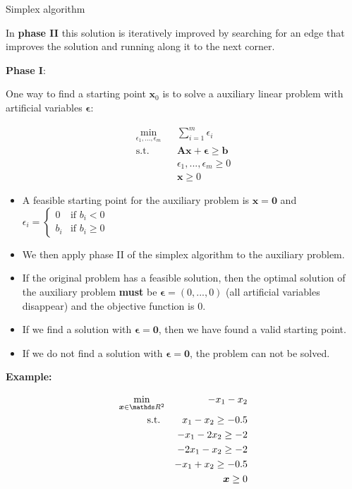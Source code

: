 \begin{vbframe}{Simplex algorithm}
\lz

In \textbf{phase II} this solution is iteratively improved by searching for an edge that improves the solution and running along it to the next corner.

\framebreak

\textbf{Phase I}:

One way to find a starting point $\bm{x}_0$ is to solve a auxiliary linear problem with artificial variables $\bm{\epsilon}$:

\begin{eqnarray*}
\min_{\epsilon_1, ..., \epsilon_m} && \sum_{i = 1}^m \epsilon_i \\
\text{s.t. } && \bm{Ax} + \bm{\epsilon} \ge \bm{b} \\
&& \epsilon_1, ..., \epsilon_m \ge 0\\
&& \bm{x} \ge 0
\end{eqnarray*}

\begin{itemize}
\item A feasible starting point for the auxiliary problem is $\bm{x} = \bm{0}$ and $\epsilon_i = \begin{cases} 0 & \text{if } b_i < 0 \\
b_i & \text{if } b_i \ge 0
\end{cases}$
\item We then apply phase II of the simplex algorithm to the auxiliary problem.
\item If the original problem has a feasible solution, then the optimal solution of the auxiliary problem \textbf{must} be $\bm{\epsilon} = (0, ..., 0)$ (all artificial variables disappear) and the objective function is $0$.
\item If we find a solution with $\bm{\epsilon} = \bm{0}$, then we have found a valid starting point.
\item If we do not find a solution with $\bm{\epsilon} = \bm{0}$, the problem can not be solved.
\end{itemize}

\framebreak

\textbf{Example:}

\begin{eqnarray*}
\min_{\bm{x} \in \R^2} && -x_1 - x_2 \\
\text{s.t. } && x_1 - x_2 \ge - 0.5 \\
&& - x_1 - 2 x_2 \ge - 2 \\
&& - 2x_1 - x_2 \ge - 2 \\
&& - x_1 + x_2 \ge - 0.5 \\
&& \bm{x} \ge 0
\end{eqnarray*}


\end{vbframe}
